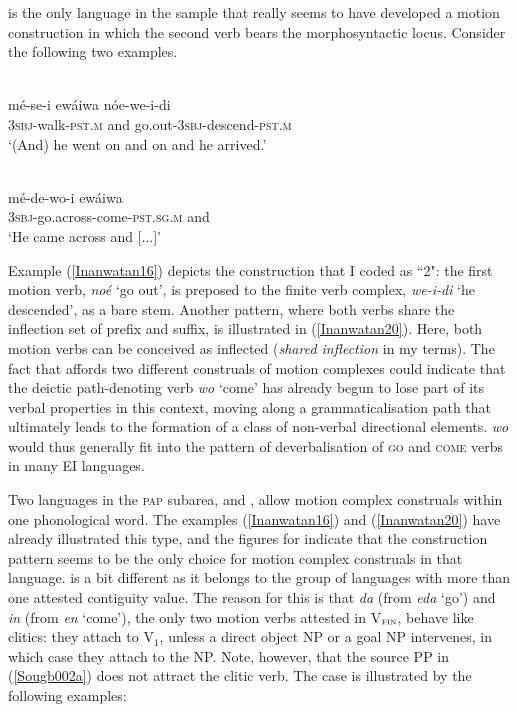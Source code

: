  is the only language in the sample that really seems to have developed a motion construction in which the second verb bears the morphosyntactic locus. Consider the following two examples.

\ea \label{Inanwatan16}
\\
\gll mé-se-i ewáiwa nóe-we-i-di \\
\textsc{3}\textsc{sbj}-walk-\textsc{pst}.\textsc{m} and go.out-\textsc{3}\textsc{sbj}-descend-\textsc{pst}.\textsc{m} \\
\glft `(And) he went on and on and he arrived.'\\ 
\z

\ea \label{Inanwatan20}
\\
\gll mé-de-wo-i ewáiwa \\
\textsc{3}\textsc{sbj}-go.across-come-\textsc{pst}.\textsc{sg}.\textsc{m} and \\
\glft `He came across and [...]'\\ 
\z

Example (\ref{Inanwatan16}) depicts the construction that I coded as ``2": the first motion verb, \textit{noé} `go out', is preposed to the finite verb complex, \textit{we-i-di} `he descended', as a bare stem. Another pattern, where both verbs share the inflection set of prefix and suffix, is illustrated in (\ref{Inanwatan20}). Here, both motion verbs can be conceived as inflected (\textit{shared inflection }in my terms). The fact that  affords two different construals of motion complexes could indicate that the deictic path-denoting verb \textit{wo} `come' has already begun to lose part of its verbal properties in this context, moving along a grammaticalisation path that ultimately leads to the formation of a class of non-verbal directional elements.  \textit{wo} would thus generally fit into the pattern of deverbalisation of \textsc{go} and \textsc{come} verbs in many EI languages.

Two languages in the \textsc{pap} subarea,  and , allow motion complex construals within one phonological word. The  examples (\ref{Inanwatan16}) and (\ref{Inanwatan20}) have already illustrated this type, and the figures for  indicate that the construction pattern seems to be the only choice for motion complex construals in that language.  is a bit different as it belongs to the group of languages with more than one attested contiguity value. The reason for this is that  \textit{da} (from \textit{eda} `go') and \textit{in} (from \textit{en} `come'), the only two motion verbs attested in V$_{\textsc{fin}}$, behave like clitics: they attach to V$_{1}$, unless a direct object NP or a goal NP intervenes, in which case they attach to the NP. Note, however, that the source PP in (\ref{Sougb002a}) does not attract the clitic verb. The  case is illustrated by the following examples:

